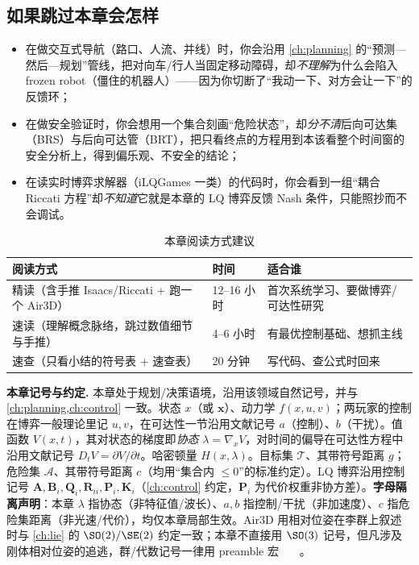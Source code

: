 \subsection*{如果跳过本章会怎样}
\begin{itemize}
  \item 在做交互式导航（路口、人流、并线）时，你会沿用 \cref{ch:planning} 的“预测—然后—规划”管线，把对向车/行人当固定移动障碍，却\emph{不理解}为什么会陷入 frozen robot（僵住的机器人）——因为你切断了“我动一下、对方会让一下”的反馈环；
  \item 在做安全验证时，你会想用一个集合刻画“危险状态”，却\emph{分不清}后向可达集（BRS）与后向可达管（BRT），把只看终点的方程用到本该看整个时间窗的安全分析上，得到偏乐观、不安全的结论；
  \item 在读实时博弈求解器（iLQGames 一类）的代码时，你会看到一组“耦合 Riccati 方程”却\emph{不知道}它就是本章的 LQ 博弈反馈 Nash 条件，只能照抄而不会调试。
\end{itemize}

\begin{table}[H]\centering\small
\caption{本章阅读方式建议}
\label{tab:dg-reading}
\begin{tabular}{lll}
\toprule
阅读方式 & 时间 & 适合谁 \\
\midrule
精读（含手推 Isaacs/Riccati + 跑一个 Air3D） & 12--16 小时 & 首次系统学习、要做博弈/可达性研究 \\
速读（理解概念脉络，跳过数值细节与手推） & 4--6 小时 & 有最优控制基础、想抓主线 \\
速查（只看小结的符号表 + 速查表） & 20 分钟 & 写代码、查公式时回来 \\
\bottomrule
\end{tabular}
\end{table}

\begin{note}
\textbf{本章记号与约定.}\;
本章处于规划/决策语境，沿用该领域自然记号，并与 \cref{ch:planning,ch:control} 一致。状态 $x$（或 $\mathbf x$）、动力学 $f(x,u,v)$；两玩家的控制在博弈一般理论里记 $u,v$，在可达性一节沿用文献记号 $a$（控制）、$b$（干扰）。值函数 $V(x,t)$，其对状态的梯度即\emph{协态} $\lambda=\nabla_x V$，对时间的偏导在可达性方程中沿用文献记号 $D_t V=\partial V/\partial t$。哈密顿量 $H(x,\lambda)$。目标集 $\mathcal{T}$、其带符号距离 $g$；危险集 $\mathcal{A}$、其带符号距离 $c$（均用“集合内 $\le0$”的标准约定）。LQ 博弈沿用控制记号 $\mathbf A,\mathbf B_i,\mathbf Q_i,\mathbf R_{ii},\mathbf P_i,\mathbf K_i$（\cref{ch:control} 约定，$\mathbf P_i$ 为代价权重非协方差）。\textbf{字母隔离声明}：本章 $\lambda$ 指协态（非特征值/波长）、$a,b$ 指控制/干扰（非加速度）、$c$ 指危险集距离（非光速/代价），均仅本章局部生效。Air3D 用相对位姿在李群上叙述时与 \cref{ch:lie} 的 $\SO(2)/\SE(2)$ 约定一致；本章不直接用 $\SO(3)$ 记号，但凡涉及刚体相对位姿的追逃，群/代数记号一律用 preamble 宏 \SO\ \SE\ \so\ \se。
\end{note}

